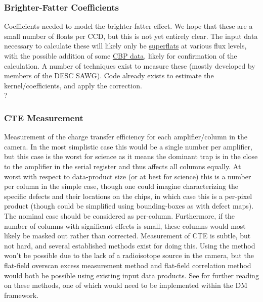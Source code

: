 \subsubsection{Brighter-Fatter Coefficients}\label{sec:CPP:output:brighterFatterCoeffs}
Coefficients needed to model the brighter-fatter effect. We hope that these are a small number of floats per CCD, but this is not yet entirely clear. The input data necessary to calculate these will likely only be \hyperref[sec:CPP:inputs:broadFlat]{superflats} at various flux levels, with the possible addition of some \hyperref[sec:CPP:inputs:CBP]{CBP data}, likely for confirmation of the calculation.
\alg A number of techniques exist to measure these (mostly developed by members of the DESC SAWG). Code already exists to estimate the kernel/coefficients, and apply the correction.
\\ \dragons ?


\subsubsection{CTE Measurement}\label{sec:CPP:output:CTE}
Measurement of the charge transfer efficiency for each amplifier/column in the camera. In the most simplistic case this would be a single number per amplifier, but this case is the worst for science as it means the dominant trap is in the close to the amplifier in the serial register and thus affects all columns equally. At worst with respect to data-product size (or at best for science) this is a number per column in the simple case, though one could imagine characterizing the specific defects and their locations on the chips, in which case this is a per-pixel product (though could be simplified using bounding-boxes as with defect maps). The nominal case should be considered as per-column. Furthermore, if the number of columns with significant effects is small, these columns would most likely be masked out rather than corrected.
\alg Measurement of CTE is subtle, but not hard, and several established methods exist for doing this. Using the \fefiftyfive method won't be possible due to the lack of a radioisotope source in the camera, but the flat-field overscan excess measurement method and flat-field correlation method would both be possible using existing input data products. See \XXX{} for further reading on these methods, one of which would need to be implemented within the DM framework.


